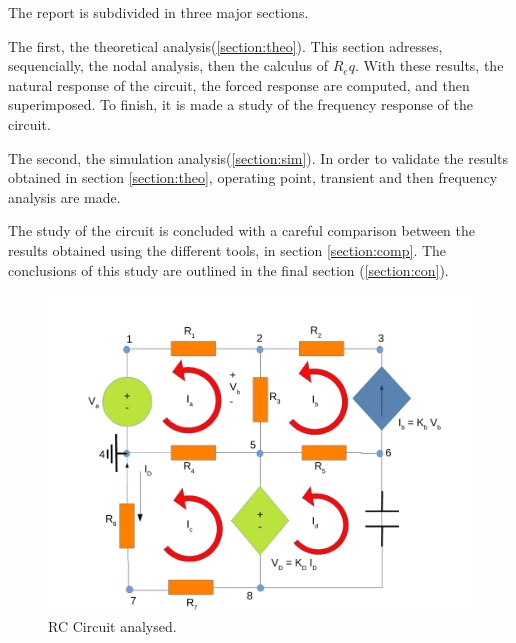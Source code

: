\par
The report is subdivided in three major sections.
\par The first, the theoretical analysis(\ref{section:theo}). This section adresses, sequencially, the nodal analysis, then the calculus of $R_eq$. With these results, the natural response of the circuit, the forced response are computed, and then superimposed. To finish, it is made a study of the frequency response of the circuit.
\par The second, the simulation analysis(\ref{section:sim}). In order to validate the results obtained in section \ref{section:theo}, operating point, transient and then frequency analysis are made.
\par The study of the circuit is concluded with a careful comparison between the results obtained using the different tools, in section \ref{section:comp}.
The conclusions of this study are outlined in the final section (\ref{section:con}).



\begin{figure}[ht] \centering
\includegraphics[width=0.8\linewidth]{t2draw.pdf}
\caption{ RC Circuit analysed.}
\label{RC Circuit.}
\end{figure}
\par 
   

\newpage
















